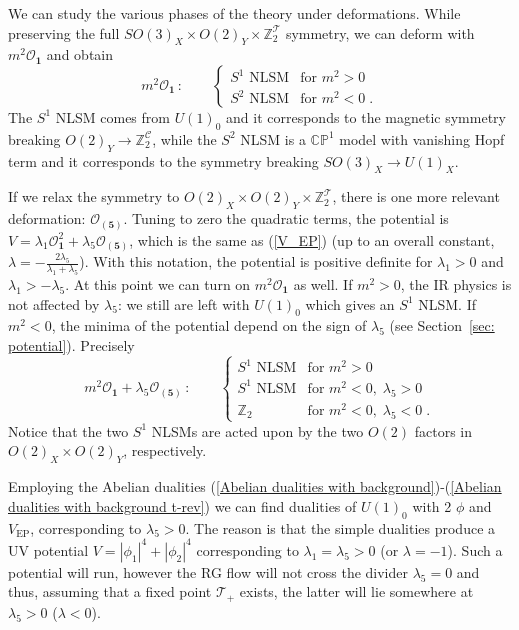 \documentclass[a4paper, 12pt]{article}
\newcommand{\rep}[1]{\ensuremath{\mathbf{#1}}}
\numberwithin{equation}{section}
\newcommand{\be}{\begin{equation}} \newcommand{\ee}{\end{equation}}
\newcommand{\cC}{\mathcal{C}}
\newcommand{\cO}{\mathcal{O}}
\newcommand{\cT}{\mathcal{T}}
\newcommand{\bC}{\mathbb{C}}
\newcommand{\bP}{\mathbb{P}}
\newcommand{\bZ}{\mathbb{Z}}
\begin{document}
We can study the various phases of the theory under deformations. While preserving the full $SO(3)_X \times O(2)_Y \times \bZ_2^\cT$ symmetry, we can deform with $m^2 \cO_\rep1$ and obtain
\be
m^2 \cO_\rep1\,: \qquad \begin{cases} S^1 \text{ NLSM} & \text{for } m^2 > 0 \\ S^2 \text{ NLSM} & \text{for } m^2 < 0 \;. \end{cases}
\ee
The $S^1$ NLSM comes from $U(1)_0$ and it corresponds to the magnetic symmetry breaking $O(2)_Y \to \bZ_2^\cC$, while the $S^2$ NLSM is a $\bC\bP^1$ model with vanishing Hopf term and it corresponds to the symmetry breaking $SO(3)_X \to U(1)_X$.

If we relax the symmetry to $O(2)_X \times O(2)_Y \times \bZ_2^\cT$, there is one more relevant deformation: $\cO_{(\rep5)}$. Tuning to zero the quadratic terms, the potential is $V = \lambda_1 \cO_\rep1^2 + \lambda_5 \cO_{(\rep5)}$, which is the same as (\ref{V_EP}) (up to an overall constant, $\lambda = - \frac{2\lambda_5}{\lambda_1 + \lambda_5}$). With this notation, the potential is positive definite for $\lambda_1 > 0$ and $\lambda_1 > - \lambda_5$. At this point we can turn on $m^2 \cO_\rep1$ as well. If $m^2 > 0$, the IR physics is not affected by $\lambda_5$: we still are left with $U(1)_0$ which gives an $S^1$ NLSM. If $m^2 < 0$, the minima of the potential depend on the sign of $\lambda_5$ (see Section~\ref{sec: potential}). Precisely
\be
m^2 \cO_\rep1 + \lambda_5 \cO_{(\rep5)}\,: \qquad \begin{cases} S^1 \text{ NLSM} & \text{for } m^2 > 0 \\ S^1 \text{ NLSM} & \text{for } m^2<0,\; \lambda_5>0 \\ \bZ_2 & \text{for } m^2<0,\; \lambda_5<0 \;. \end{cases}
\ee
Notice that the two $S^1$ NLSMs are acted upon by the two $O(2)$ factors in $O(2)_X \times O(2)_Y$, respectively.

Employing the Abelian dualities (\ref{Abelian dualities with background})-(\ref{Abelian dualities with background t-rev}) we can find dualities of $U(1)_0$ with 2 $\phi$ and $V_\text{EP}$, corresponding to $\lambda_5>0$. The reason is that the simple dualities produce a UV potential $V = |\phi_1|^4 + |\phi_2|^4$ corresponding to $\lambda_1 = \lambda_5 > 0$ (or $\lambda=-1$). Such a potential will run, however the RG flow will not cross the divider $\lambda_5 = 0$ and thus, assuming that a fixed point $\cT_+$ exists, the latter will lie somewhere at $\lambda_5>0$ ($\lambda<0$).
\end{document}
